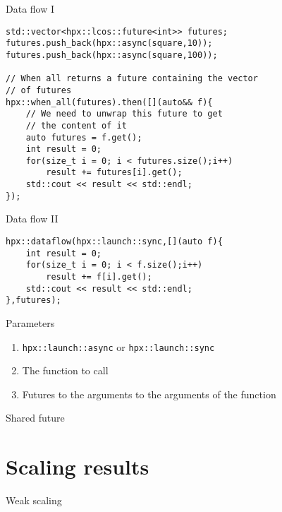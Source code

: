 \documentclass[12pt,t]{beamer}
\begin{document}
\begin{frame}[fragile]{Data flow I}
\begin{lstlisting}
std::vector<hpx::lcos::future<int>> futures;
futures.push_back(hpx::async(square,10));
futures.push_back(hpx::async(square,100));

// When all returns a future containing the vector 
// of futures
hpx::when_all(futures).then([](auto&& f){
    // We need to unwrap this future to get 
    // the content of it
    auto futures = f.get();
    int result = 0;
    for(size_t i = 0; i < futures.size();i++)
        result += futures[i].get();
    std::cout << result << std::endl;
});
\end{lstlisting}
\end{frame}


\begin{frame}[fragile]{Data flow II}

\begin{lstlisting}
hpx::dataflow(hpx::launch::sync,[](auto f){
    int result = 0;
    for(size_t i = 0; i < f.size();i++)
        result += f[i].get();
    std::cout << result << std::endl;
},futures);
\end{lstlisting}

\begin{block}{Parameters}
\begin{enumerate}
\item \lstinline|hpx::launch::async| or \lstinline|hpx::launch::sync|
\item The function to call
\item Futures to the arguments to the arguments of the function
\end{enumerate}
\end{block}


\end{frame}


\begin{frame}{Shared future}



\end{frame}

\section{Scaling results}

\begin{frame}{Weak scaling}

\end{frame}
\end{document}
